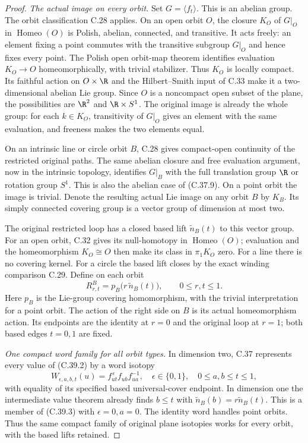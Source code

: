 \begin{proof}
\emph{The actual image on every orbit.}
Set $G=\langle f_t\rangle$. This is an abelian group.
The orbit classification C.28 applies.
On an open orbit $O$, the closure $K_O$ of $G|_O$ in
$\operatorname{Homeo}(O)$ is Polish, abelian, connected,
and transitive. It acts freely: an element fixing a point
commutes with the transitive subgroup $G|_O$ and hence fixes
every point. The Polish open orbit-map theorem identifies
evaluation $K_O\to O$ homeomorphically, with trivial
stabilizer. Thus $K_O$ is locally compact. Its faithful
action on $O\times\R$ and the Hilbert--Smith input of C.33
make it a two-dimensional abelian Lie group.
Since $O$ is a noncompact open subset of the plane, the
possibilities are $\R^2$ and $\R\times S^1$.
The original image is already the whole group:
for each $k\in K_O$, transitivity of $G|_O$ gives an
element with the same evaluation, and freeness makes
the two elements equal.

On an intrinsic line or circle orbit $B$, C.28 gives
compact-open continuity of the restricted original paths.
The same abelian closure and free evaluation argument,
now in the intrinsic topology, identifies $G|_B$ with
the full translation group $\R$ or rotation group $S^1$.
This is also the abelian case of (C.37.9).
On a point orbit the image is trivial.
Denote the resulting actual Lie image on any orbit $B$
by $K_B$. Its simply connected covering group is a vector
group of dimension at most two.

The original restricted loop has a closed based lift
$\widetilde n_B(t)$ to this vector group.
For an open orbit, C.32 gives its null-homotopy in
$\operatorname{Homeo}(O)$; evaluation and the
homeomorphism $K_O\cong O$ then make its class in
$\pi_1K_O$ zero. For a line there is no covering kernel.
For a circle the based lift closes by the exact winding
comparison C.29. Define on each orbit
\[
              R^B_{r,t}
                =p_B\bigl(r\,\widetilde n_B(t)\bigr),
                    \qquad 0\leq r,t\leq1.
                                                        \tag{C.39.2}
\]
Here $p_B$ is the Lie-group covering homomorphism,
with the trivial interpretation for a point orbit.
The action of the right side on $B$ is its actual
homeomorphism action. Its endpoints are the identity
at $r=0$ and the original loop at $r=1$; both based
edges $t=0,1$ are fixed.

\emph{One compact word family for all orbit types.}
In dimension two, C.37 represents every value of
(C.39.2) by a word isotopy
\[
 W_{\epsilon,a,b,t}(u)
        =f_{ut}^{\,\epsilon}f_{ub}f_{ua}^{-1},
 \quad \epsilon\in\{0,1\},\quad 0\leq a,b\leq t\leq1,
                                                        \tag{C.39.3}
\]
with equality of its specified based universal-cover
endpoint. In dimension one the intermediate value
theorem already finds $b\leq t$ with
$\widetilde n_B(b)=r\widetilde n_B(t)$.
This is a member of (C.39.3) with $\epsilon=0,a=0$.
The identity word handles point orbits.
Thus the same compact family of original plane isotopies
works for every orbit, with the based lifts retained.


\end{proof}
